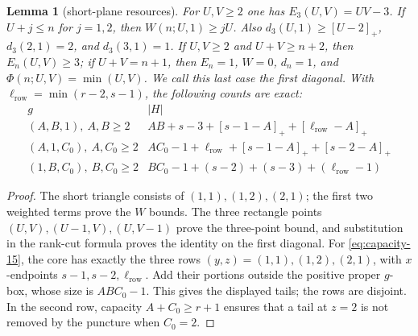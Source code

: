 \documentclass[11pt]{article}
\newtheorem{lemma}[theorem]{Lemma}
\theoremstyle{definition}
\theoremstyle{remark}
\theoremstyle{plain}
\begin{document}
\begin{lemma}[short-plane resources]\label{res:A3.1}
For $U,V\ge2$ one has $E_3(U,V)=UV-3$.
If $U+j\le n$ for $j=1,2$, then $W(n;U,1)\ge jU$.
Also $d_3(U,1)\ge[U-2]_+$, $d_3(2,1)=2$, and $d_3(3,1)=1$.
If $U,V\ge2$ and $U+V\ge n+2$, then $E_n(U,V)\ge3$;
if $U+V=n+1$, then $E_n=1$, $W=0$, $d_n=1$, and
$\Phi(n;U,V)=\min(U,V)$. We call this last case the first diagonal.
With $\ell_{\mathrm{row}}=\min(r-2,s-1)$, the following counts are exact:
\[
\begin{array}{c|l}
g&|H|\\\hline
(A,B,1),\ A,B\ge2&AB+s-3+[s-1-A]_++[\ell_{\mathrm{row}}-A]_+\\
(A,1,C_0),\ A,C_0\ge2&AC_0-1+\ell_{\mathrm{row}}+[s-1-A]_++[s-2-A]_+\\
(1,B,C_0),\ B,C_0\ge2&BC_0-1+(s-2)+(s-3)+(\ell_{\mathrm{row}}-1)
\end{array}\tag{3.15}\label{eq:capacity-15}
\]
\end{lemma}
\begin{proof}
The short triangle consists of $(1,1),(1,2),(2,1)$; the first two
weighted terms prove the $W$ bounds.  The three rectangle points
$(U,V),(U-1,V),(U,V-1)$ prove the three-point bound, and substitution
in the rank-cut formula proves the identity on the first diagonal.
For \eqref{eq:capacity-15}, the core has exactly the three rows $(y,z)=(1,1),(1,2),(2,1)$,
with $x$-endpoints $s-1,s-2,\ell_{\mathrm{row}}$.  Add their portions outside the positive
proper $g$-box, whose size is $ABC_0-1$.  This gives the displayed tails;
the rows are disjoint.  In the second row, capacity
$A+C_0\ge r+1$ ensures that a tail at $z=2$ is not removed by the puncture
when $C_0=2$. \end{proof}
\end{document}
